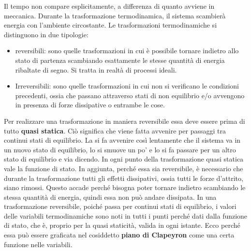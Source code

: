 \begin{figure}[htpb]
\end{figure}
\FloatBarrier
Il tempo non compare esplicitamente, a differenza di quanto avviene in meccanica. Durante la trasformazione termodinamica, il sistema scambierà energia con l'ambiente circostante.
Le trasformazioni termodinamiche si distinguono in due tipologie:

\begin{itemize}
	\item reversibili: sono quelle trasformazioni in cui è possibile tornare indietro allo stato di partenza scambiando esattamente le stesse quantità di energia ribaltate di segno. Si tratta in realtà di processi ideali.
	\item Irreversibili: sono quelle trasformazioni in cui non si verificano le condizioni precedenti, ossia che passano attraverso stati di non equilibrio e/o avvengono in presenza di forze dissipative o entrambe le cose.
\end{itemize}

Per realizzare una trasformazione in maniera reversibile essa deve essere prima di tutto \textbf{quasi statica}. Ciò significa che viene fatta avvenire per passaggi tra continui stati di equilibrio. La si fa avvenire così lentamente che il sistema va in un nuovo stato di equilibrio, lo si smuove un po' e lo si fa passare per un altro stato di equilibrio e via dicendo. In ogni punto della trasformazione quasi statica vale la funzione di stato. In aggiunta, perché essa sia reversibile, è necessario che durante la trasformazione tutti gli effetti dissipativi, ossia tutti le forze d'attrito, siano rimossi. Questo accade perché bisogna poter tornare indietro scambiando le stessa quantità di energia, quindi essa non può andare dissipata.
In una trasformazione reversibile, poiché passa per continui stati di equilibrio, i valori delle variabili termodinamiche sono noti in tutti i punti perché dati dalla funzione di stato, che è, proprio per la quasi staticità, valida in ogni istante. Ecco perché essa può essere graficata nel cosiddetto \textbf{piano di Clapeyron} come una certa funzione nelle variabili.


